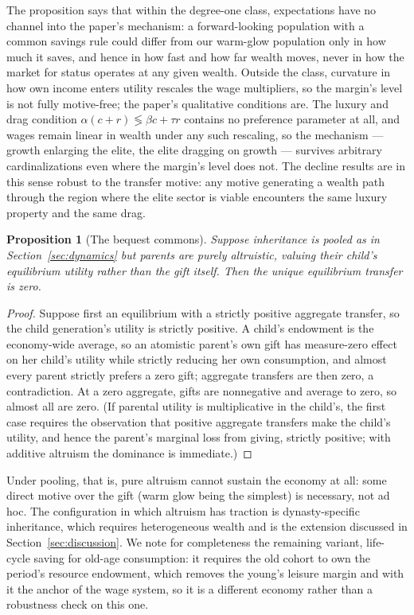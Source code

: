 \documentclass[12pt,letterpaper]{article}
\newtheorem{proposition}{Proposition}
\theoremstyle{definition}
\begin{document}
The proposition says that within the degree-one class, expectations have no channel into the paper's mechanism: a forward-looking population with a common savings rule could differ from our warm-glow population only in how much it saves, and hence in how fast and how far wealth moves, never in how the market for status operates at any given wealth.
Outside the class, curvature in how own income enters utility rescales the wage multipliers, so the margin's level is not fully motive-free; the paper's qualitative conditions are.
The luxury and drag condition $\alpha(c+r)\lessgtr\beta c+\tau r$ contains no preference parameter at all, and wages remain linear in wealth under any such rescaling, so the mechanism --- growth enlarging the elite, the elite dragging on growth --- survives arbitrary cardinalizations even where the margin's level does not.
The decline results are in this sense robust to the transfer motive: any motive generating a wealth path through the region where the elite sector is viable encounters the same luxury property and the same drag.

\begin{proposition}[The bequest commons]\label{prop:commons}
Suppose inheritance is pooled as in Section~\ref{sec:dynamics} but parents are purely altruistic, valuing their child's equilibrium utility rather than the gift itself.
Then the unique equilibrium transfer is zero.
\end{proposition}

\begin{proof}
Suppose first an equilibrium with a strictly positive aggregate transfer, so the child generation's utility is strictly positive.
A child's endowment is the economy-wide average, so an atomistic parent's own gift has measure-zero effect on her child's utility while strictly reducing her own consumption, and almost every parent strictly prefers a zero gift; aggregate transfers are then zero, a contradiction.
At a zero aggregate, gifts are nonnegative and average to zero, so almost all are zero.
(If parental utility is multiplicative in the child's, the first case requires the observation that positive aggregate transfers make the child's utility, and hence the parent's marginal loss from giving, strictly positive; with additive altruism the dominance is immediate.)
\end{proof}

Under pooling, that is, pure altruism cannot sustain the economy at all: some direct motive over the gift (warm glow being the simplest) is necessary, not ad hoc.
The configuration in which altruism has traction is dynasty-specific inheritance, which requires heterogeneous wealth and is the extension discussed in Section~\ref{sec:discussion}.
We note for completeness the remaining variant, life-cycle saving for old-age consumption: it requires the old cohort to own the period's resource endowment, which removes the young's leisure margin and with it the anchor of the wage system, so it is a different economy rather than a robustness check on this one.



\end{document}
